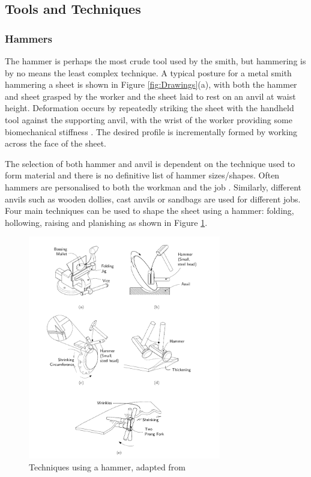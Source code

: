 \subsection{Tools and Techniques} \label{sec:ManualTech}
\subsubsection{Hammers} \label{sec:ManualHammer}

The hammer is perhaps the most crude tool used by the smith, but hammering is by no means the least complex technique. A typical posture for a metal smith hammering a sheet is shown in Figure \ref{fig:Drawings}(a), with both the hammer and sheet grasped by the worker and the sheet laid to rest on an anvil at waist height. Deformation occurs by repeatedly striking the sheet with the handheld tool against the supporting anvil, with the wrist of the worker providing some biomechanical stiffness \citep{Phan2020EstimatingTask}. The desired profile is incrementally formed by working across the face of the sheet.

The selection of both hammer and anvil is dependent on the technique used to form material and there is no definitive list of hammer sizes/shapes. Often hammers are personalised to both the workman and the job \citep{Barr2013ProfessionalFabrication}. Similarly, different anvils such as wooden dollies, cast anvils or sandbags are used for different jobs. Four main techniques can be used to shape the sheet using a hammer: folding, hollowing, raising and planishing as shown in Figure \ref{fig:hammertech}. 

\begin{figure}[h]
    \centering
    \includegraphics[width=0.75\textwidth]{Images/HammeringTechDrawing.pdf}
    \caption{Techniques using a hammer, adapted from \citep{Timings2008SheetMetalwork}}
    \label{fig:hammertech}
\end{figure}

